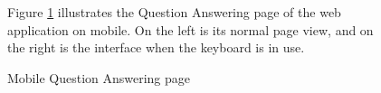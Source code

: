 \documentclass[12pt,oneside,openright,a4paper]{cpe-english-project}
\begin{document}
\begin{figure}[!h]
\begin{minipage}{.3\textwidth}
      \end{minipage}%
      \caption{Mobile Question Answering page}\label{fig:Mobile_Question_Answering_page}
      \begin{justify}
        \qquad Figure \ref{fig:Mobile_Question_Answering_page} illustrates the Question Answering page of the web application on mobile. On the left is its normal page view, and on the right is the interface when the keyboard is in use. \par
      \end{justify}
    \end{figure}
\newpage
\end{document}
